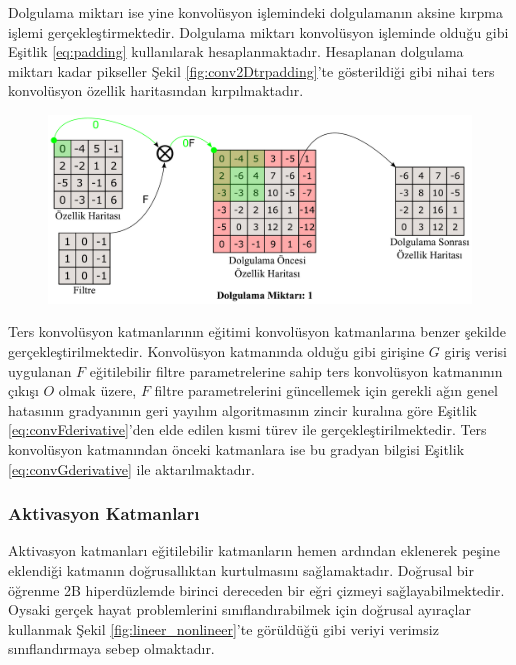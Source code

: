 Dolgulama miktarı ise yine konvolüsyon işlemindeki dolgulamanın aksine kırpma işlemi gerçekleştirmektedir. Dolgulama miktarı konvolüsyon işleminde olduğu gibi Eşitlik \ref{eq:padding} kullanılarak hesaplanmaktadır. Hesaplanan dolgulama miktarı kadar pikseller Şekil \ref{fig:conv2Dtrpadding}'te gösterildiği gibi nihai ters konvolüsyon özellik haritasından kırpılmaktadır.

\begin{figure}[h!]
	\begin{center}
		\vspace{0.4cm}
		{
			\vspace{0.4cm}
			\includegraphics[scale=0.3]{Yapilan-Calismalar/Figures/conv2Dtrpadding.pdf}
		}
	\end{center}
\end{figure}

Ters konvolüsyon katmanlarının eğitimi konvolüsyon katmanlarına benzer şekilde gerçekleştirilmektedir. Konvolüsyon katmanında olduğu gibi girişine $G$ giriş verisi uygulanan $F$ eğitilebilir filtre parametrelerine sahip ters konvolüsyon katmanının çıkışı $O$ olmak üzere, $F$ filtre parametrelerini güncellemek için gerekli ağın genel hatasının gradyanının geri yayılım algoritmasının zincir kuralına göre Eşitlik \ref{eq:convFderivative}'den elde edilen kısmi türev ile gerçekleştirilmektedir. Ters konvolüsyon katmanından önceki katmanlara ise bu gradyan bilgisi Eşitlik \ref{eq:convGderivative} ile aktarılmaktadır.
 
\subsubsection{Aktivasyon Katmanları}
Aktivasyon katmanları eğitilebilir katmanların hemen ardından eklenerek peşine eklendiği katmanın doğrusallıktan kurtulmasını sağlamaktadır. Doğrusal bir öğrenme 2B hiperdüzlemde birinci dereceden bir eğri çizmeyi sağlayabilmektedir. Oysaki gerçek hayat problemlerini sınıflandırabilmek için doğrusal ayıraçlar kullanmak Şekil \ref{fig:lineer_nonlineer}'te görüldüğü gibi veriyi verimsiz sınıflandırmaya sebep olmaktadır.

